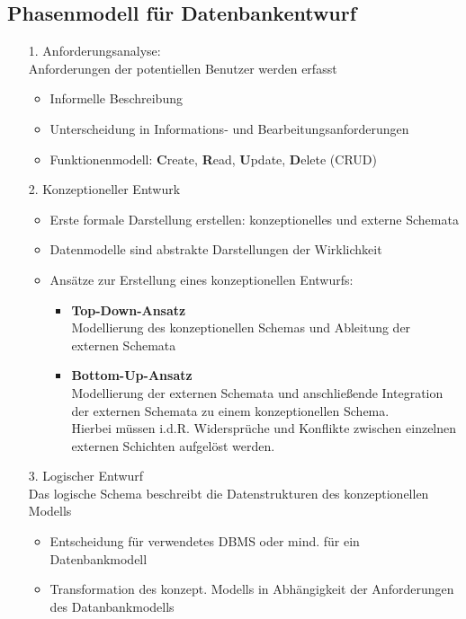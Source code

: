 \documentclass{scrreprt}
\begin{document}
\subsection{Phasenmodell für Datenbankentwurf}
\begin{itemize}
  \item [1.] Anforderungsanalyse:
  \\Anforderungen der potentiellen Benutzer werden erfasst
  \begin{itemize}
    \item Informelle Beschreibung
    \item Unterscheidung in Informations- und Bearbeitungsanforderungen
    \item Funktionenmodell: \textbf{C}reate, \textbf{R}ead, \textbf{U}pdate, \textbf{D}elete (CRUD)
  \end{itemize}
  \item [2.] Konzeptioneller Entwurk
  \begin{itemize}
    \item Erste formale Darstellung erstellen: konzeptionelles und externe Schemata
    \item Datenmodelle sind abstrakte Darstellungen der Wirklichkeit
    \item Ansätze zur Erstellung eines konzeptionellen Entwurfs:
    \begin{itemize}
      \item \textbf{Top-Down-Ansatz}
      \\Modellierung des konzeptionellen Schemas und Ableitung der externen Schemata
      \item \textbf{Bottom-Up-Ansatz}
      \\Modellierung der externen Schemata und anschließende Integration der externen Schemata zu einem konzeptionellen Schema.
      \\Hierbei müssen i.d.R. Widersprüche und Konflikte zwischen einzelnen externen Schichten aufgelöst werden.
    \end{itemize}
  \end{itemize}
  \item [3.] Logischer Entwurf
  \\Das logische Schema beschreibt die Datenstrukturen des konzeptionellen Modells
  \begin{itemize}
    \item Entscheidung für verwendetes DBMS oder mind. für ein Datenbankmodell
    \item Transformation des konzept. Modells in Abhängigkeit der Anforderungen des Datanbankmodells

\end{itemize}
\end{itemize}
\end{document}
